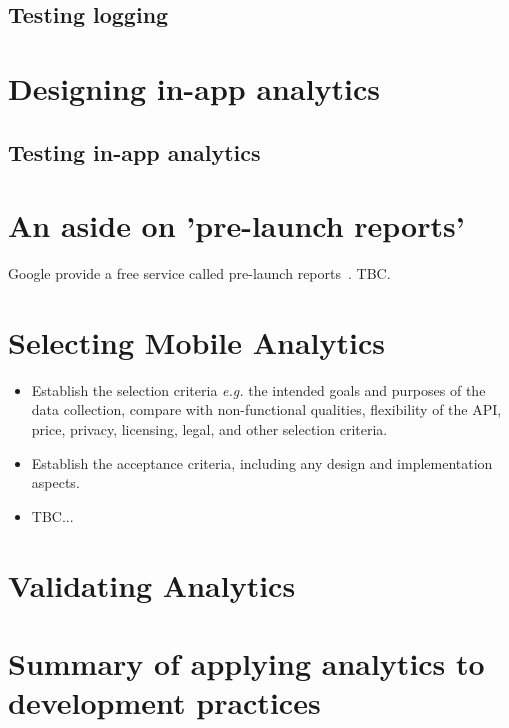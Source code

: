 \subsection{Testing logging}

\section{Designing in-app analytics}
\subsection{Testing in-app analytics}

\section{An aside on 'pre-launch reports'}
Google provide a free service called pre-launch reports~\cite{google_use_pre_launch_reports}. TBC.
\section{Selecting Mobile Analytics}

\begin{itemize}
    \item Establish the selection criteria \emph{e.g.} the intended goals and purposes of the data collection, compare with non-functional qualities, flexibility of the API, price, privacy, licensing, legal, and other selection criteria.
    \item Establish the acceptance criteria, including any design and implementation aspects.
    \item TBC...
\end{itemize}

\section{Validating Analytics}


\section{Summary of applying analytics to development practices}
